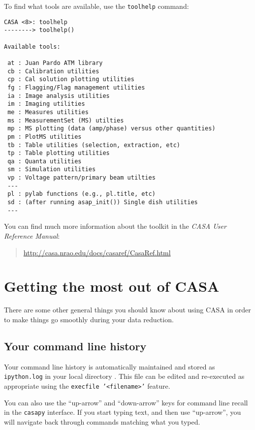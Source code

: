 To find what tools are available, use the {\tt toolhelp} command:
\small
\begin{verbatim}
CASA <8>: toolhelp
--------> toolhelp()
 
Available tools: 

 at : Juan Pardo ATM library
 cb : Calibration utilities
 cp : Cal solution plotting utilities
 fg : Flagging/Flag management utilities
 ia : Image analysis utilities
 im : Imaging utilities
 me : Measures utilities
 ms : MeasurementSet (MS) utilties
 mp : MS plotting (data (amp/phase) versus other quantities)
 pm : PlotMS utilities
 tb : Table utilities (selection, extraction, etc)
 tp : Table plotting utilities
 qa : Quanta utilities
 sm : Simulation utilities
 vp : Voltage pattern/primary beam utilties
 ---
 pl : pylab functions (e.g., pl.title, etc)
 sd : (after running asap_init()) Single dish utilities
 ---

\end{verbatim}
\normalsize

You can find much more information about the toolkit in the 
{\em CASA User Reference Manual}:
\begin{quote}
  \url{http://casa.nrao.edu/docs/casaref/CasaRef.html}
\end{quote}

\section{Getting the most out of CASA}
\label{section:intro.common}

There are some other general things you should know about using
CASA in order to make things go smoothly during your data reduction.

\subsection{Your command line history}
\label{section:intro.common.commands}

Your command line history is automatically maintained and stored 
as {\tt ipython.log} in your local directory . This file can be edited and
re-executed as appropriate using the {\tt execfile '<filename>'}
feature.

You can also use the ``up-arrow'' and ``down-arrow'' keys for command line
recall in the {\tt casapy} interface.  If you start typing text, and
then use ``up-arrow'', you will navigate back through commands
matching what you typed.

